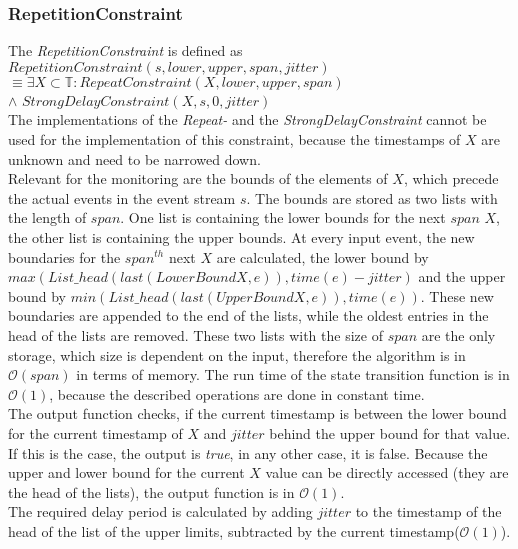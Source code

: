 \subsubsection{RepetitionConstraint}
	The  \emph{RepetitionConstraint} is defined as\\[10pt]
		$RepetitionConstraint(s, lower, upper, span, jitter)$\\
		$\equiv \exists X\subset \mathbb{T}: RepeatConstraint (X, lower, upper, span)$\\
		\hspace{7cm}$\land$ $StrongDelayConstraint(X, s, 0, jitter)$\\[10pt]
	The implementations of the \emph{Repeat-} and the \emph{StrongDelayConstraint} cannot be used for the implementation of this constraint, because the timestamps of $X$ are unknown and need to be narrowed down.\\
	Relevant for the monitoring are the bounds of the elements of $X$, which precede the actual events in the event stream $s$. The bounds are stored as two lists with the length of $span$. One list is containing the lower bounds for the next $span$ $X$, the other list is containing the upper bounds. At every input event, the new boundaries for the $span^{th}$ next $X$ are calculated, the lower bound by $max(List\_head(last(LowerBoundX, e)), time(e)-jitter)$ and the upper bound by $min(List\_head(last(UpperBoundX, e)), time(e))$. These new boundaries are appended to the end of the lists, while the oldest entries in the head of the lists are removed. These two lists with the size of $span$ are the only storage, which size is dependent on the input, therefore the algorithm is in $\mathcal{O}(span)$ in terms of memory. The run time of the state transition function is in $\mathcal{O}(1)$, because the described operations are done in constant time.\\
	The output function checks, if the current timestamp is between the lower bound for the current timestamp of $X$ and $jitter$ behind the upper bound for that value. If this is the case, the output is \emph{true}, in any other case, it is false. Because the upper and lower bound for the current $X$ value can be directly accessed (they are the head of the lists), the output function is in $\mathcal{O}(1)$.\\
	The required delay period is calculated by adding $jitter$ to the timestamp of the head of the list of the upper limits, subtracted by the current timestamp($\mathcal{O}(1)$).
